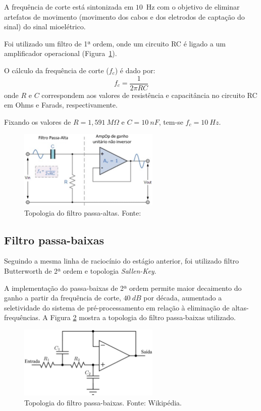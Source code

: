 \documentclass[a4paper,11pt]{article}
\begin{document}
A frequência de corte está sintonizada em $10$~Hz com o objetivo de eliminar artefatos de movimento (movimento dos cabos e dos eletrodos de captação do sinal) do sinal mioelétrico.

Foi utilizado um filtro de 1ª ordem, onde um circuito RC é ligado a um amplificador operacional (Figura~\ref{fig:hpf}). 

O cálculo da frequência de corte ($f_c$) é dado por:
     \begin{equation}
     	f_c=\frac{1}{2\pi RC}
     	\label{eq:fc}
     \end{equation}
onde $R$ e $C$ correspondem aos valores de resistência e capacitância no circuito RC em Ohms e Farads, respectivamente.

Fixando os valores de $R= 1,591~M\Omega$ e $C = 10~nF$, tem-se $f_c = 10~Hz$. 

\begin{figure}[h]
		\centering
		\includegraphics[width=0.6\textwidth]{fig/hpf}
		\caption{Topologia do filtro passa-altas. Fonte:~\parencite{ELETRONICS2019}}
		\label{fig:hpf}
	\end{figure}
     
\subsection{Filtro passa-baixas}      
\label{ssec:lp}
Seguindo a mesma linha de raciocínio do estágio anterior, foi utilizado filtro Butterworth de 2ª ordem e topologia \textit{Sallen-Key}.

A implementação do passa-baixas de 2ª ordem permite maior decaimento do ganho a partir da frequência de corte, $40~dB$ por década, aumentado a seletividade do sistema de pré-processamento em relação à eliminação de altas-frequências. A Figura \ref{fig:lpf} mostra a topologia do filtro passa-baixas utilizado.

	\begin{figure}[h]
		\centering
		\includegraphics[width=0.6\textwidth]{fig/lpf}
		\caption{Topologia do filtro passa-baixas. Fonte: Wikipédia.}
		\label{fig:lpf}
	\end{figure}
\end{document}
